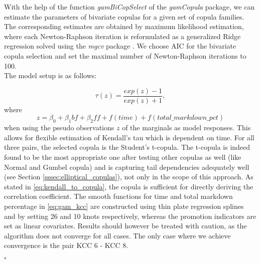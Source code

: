 With the help of the function \textit{gamBiCopSelect} of the \textit{gamCopula} package, we can estimate the parameters of bivariate copulas for a given set of copula families. The corresponding estimates are obtained by maximum likelihood estimation, where each Newton-Raphson iteration is reformulated as a generalized Ridge regression solved using the \textit{mgcv} package \citep{wood2017generalized}. We choose \ac{AIC} for the bivariate copula selection and set the maximal number of Newton-Raphson iterations to 100.  \\

The model setup is as follows: 

\begin{equation}
\tau(z) = \frac{exp(z) - 1}{exp(z) + 1},
\label{eq:tau_link}
\end{equation}
where
\begin{equation}
z = \beta_0 + \beta_1 \textit{bf} + \beta_2 \textit{ff} + f(\textit{time}) + f(\textit{total\_markdown\_pct})
\label{eq:gam_kcc}
\end{equation}
when using the pseudo observations $z$ of the marginals as model responses. This allows for flexible estimation of Kendall's tau which is dependent on time. For all three pairs, the selected copula is the Student's t-copula. The t-copula is indeed found to be the most appropriate one after testing other copulas as well (like Normal and Gumbel copula) and is capturing tail dependencies adequately well (see Section \ref{sssec:elliptical_copulas}), not only in the scope of this approach. As stated in \autoref{eq:kendall_to_copula}, the copula is sufficient for directly deriving the correlation coefficient. The smooth functions for time and total markdown percentage in \autoref{eq:gam_kcc} are constructed using thin plate regression splines and by setting 26 and 10 knots respectively, whereas the promotion indicators are set as linear covariates. Results should however be treated with caution, as the algorithm does not converge for all cases. The only case where we achieve convergence is the pair KCC 6 - KCC 8.


\hfill $\square$ \\




